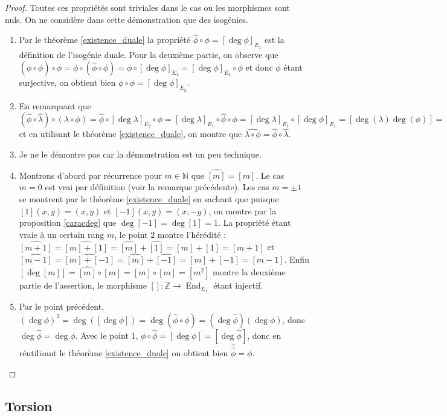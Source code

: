 \documentclass{article}
\theoremstyle{plain}%
\theoremstyle{definition}%
\newcommand{\Z}{\mathbb{Z}}
\newcommand{\N}{\mathbb{N}}
\newcommand{\h}{\widehat}
\DeclareMathOperator{\End}{End}
\begin{document}
\begin{proof}
  Toutes ces propriétés sont triviales dans le cas ou les morphismes sont nuls. On ne considère dans cette démonstration que des isogénies.
  \begin{enumerate}
    \item Par le théorème \ref{existence_duale} la propriété $\h\phi\circ\phi = [\deg{\phi}]_{E_1}$ est la définition de l'isogénie duale. Pour la deuxième partie, on observe que $(\phi\circ\h\phi)\circ\phi = \phi\circ(\h\phi\circ\phi) = \phi\circ[\deg{\phi}]_{E_1} = [\deg{\phi}]_{E_2}\circ\phi$ et donc $\phi$ étant surjective, on obtient bien $\phi\circ\h\phi = [\deg{\phi}]_{E_2}$.
    \item En remarquant que $(\h\phi\circ\h\lambda)\circ(\lambda\circ\phi) = \h\phi\circ [\deg\lambda]_{E_2} \circ\phi = [\deg\lambda]_{E_1}\circ\h\phi\circ\phi = [\deg\lambda]_{E_1}\circ [\deg\phi]_{E_1} = [\deg(\lambda)\deg(\phi)] = [\deg(\lambda\circ\phi)]$ et en utilisant le théorème \ref{existence_duale}, on montre que $\h{\lambda\circ\phi} = \h\phi\circ\h\lambda$.
    \item Je ne le démontre pas car la démonstration est un peu technique.
    \item Montrons d'abord par récurrence pour $m\in\N$ que $\h{[m]} = [m]$. Le cas $m=0$ est vrai par définition (voir la remarque précédente). Les cas $m = \pm 1$ se montrent par le théorème \ref{existence_duale} en sachant que puisque $[1](x, y) = (x, y)$ et $[-1](x, y) = (x, -y)$, on montre par la proposition \ref{caracdeg} que $\deg[-1] = \deg[1] = 1$. La propriété étant vraie à un certain rang $m$, le point $2$ montre l'hérédité : $\h{[m+1]} = \h{[m] + [1]} = \h{[m]} + \h{[1]} = [m] + [1] = [m+1]$ et $\h{[m-1]} = \h{[m] + [-1]} = \h{[m]} + \h{[-1]} = [m] + [-1] = [m-1]$.
      Enfin $[\deg [m]] = \h{[m]} \circ [m] = [m] \circ [m] = [m^2]$ montre la deuxième partie de l'assertion, le morphisme $[]:\Z\to \End_{E_1}$ étant injectif.
    \item Par le point précédent, $ (\deg\phi)^2=\deg([\deg\phi])=\deg(\h\phi\circ\phi) = (\deg\h\phi)(\deg\phi)$, donc $\deg\h\phi = \deg\phi$. Avec le point $1$, $\phi\circ\h\phi = [\deg\phi] = [\deg \h\phi]$, donc en réutilisant le théorème \ref{existence_duale} on obtient bien $\h{\h\phi} = \phi$.
  \end{enumerate}
\end{proof}

\subsection{Torsion}
\end{document}
